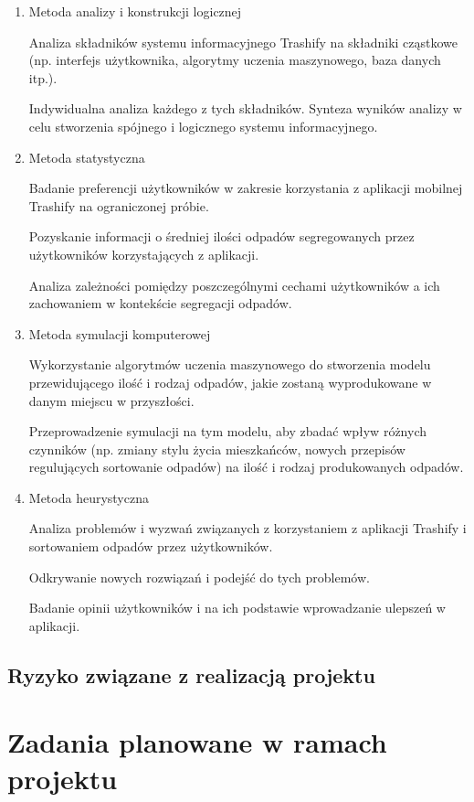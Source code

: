 \documentclass[12pt,oneside]{book}
\begin{document}
\begin{enumerate}
    \item Metoda analizy i konstrukcji logicznej
    
    Analiza składników systemu informacyjnego Trashify na składniki cząstkowe (np. interfejs użytkownika, algorytmy uczenia maszynowego, baza danych itp.).

    Indywidualna analiza każdego z tych składników.
    Synteza wyników analizy w celu stworzenia spójnego i logicznego systemu informacyjnego.
    \item Metoda statystyczna
    
    Badanie preferencji użytkowników w zakresie korzystania z aplikacji mobilnej Trashify na ograniczonej próbie.

    Pozyskanie informacji o średniej ilości odpadów segregowanych przez użytkowników korzystających z aplikacji.

    Analiza zależności pomiędzy poszczególnymi cechami użytkowników a ich zachowaniem w kontekście segregacji odpadów.    
    \item Metoda symulacji komputerowej
    
    Wykorzystanie algorytmów uczenia maszynowego do stworzenia modelu przewidującego ilość i rodzaj odpadów, jakie zostaną wyprodukowane w danym miejscu w przyszłości.
    
    Przeprowadzenie symulacji na tym modelu, aby zbadać wpływ różnych czynników (np. zmiany stylu życia mieszkańców, nowych przepisów regulujących sortowanie odpadów) na ilość i rodzaj produkowanych odpadów.

    \item Metoda heurystyczna
    
    Analiza problemów i wyzwań związanych z korzystaniem z aplikacji Trashify i sortowaniem odpadów przez użytkowników.

    Odkrywanie nowych rozwiązań i podejść do tych problemów.
    
    Badanie opinii użytkowników i na ich podstawie wprowadzanie ulepszeń w aplikacji.
\end{enumerate}

\section{Ryzyko związane z realizacją projektu}

{\let\clearpage\relax\chapter{Zadania planowane w ramach projektu}}
\end{document}
